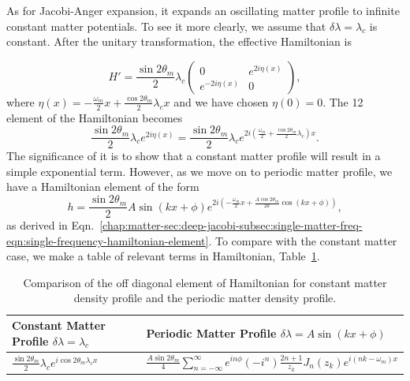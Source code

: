 As for Jacobi-Anger expansion, it expands an oscillating matter profile to infinite constant matter potentials. To see it more clearly, we assume that $\delta\lambda= \lambda_c$ is constant. After the unitary transformation, the effective Hamiltonian is

\begin{equation}
   H' = \frac{\sin 2\theta_m}{2} \lambda_c \begin{pmatrix} 0 & e^{2i\eta(x)} \\ e^{-2i\eta(x)} & 0 \end{pmatrix},
\end{equation}
where $\eta(x) = -\frac{\omega_m}{2}x + \frac{\cos 2\theta_m}{2}\lambda_c x$ and we have chosen $\eta(0)=0$.
The 12 element of the Hamiltonian becomes
\begin{equation}
   \frac{\sin 2\theta_m}{2} \lambda_c e^{2i\eta(x)} = \frac{\sin 2\theta_m}{2} \lambda_c e^{2i\left( \frac{\omega_m}{2} + \frac{\cos 2\theta_m}{2} \lambda_c \right)x} .
\end{equation}
The significance of it is to show that a constant matter profile will result in a simple exponential term. However, as we move on to periodic matter profile, we have a Hamiltonian element of the form
\begin{equation}
   h = \frac{\sin 2\theta_m}{2} A \sin (kx+\phi) e^{2i\left( -\frac{\omega_m}{2} x + \frac{A \cos 2\theta_m}{2k} \cos (kx+\phi) \right)},
\end{equation}
as derived in Eqn.~\ref{chap:matter-sec:deep-jacobi-subsec:single-matter-freq-eqn:single-frequency-hamiltonian-element}. To compare with the constant matter case, we make a table of relevant terms in Hamiltonian, Table~\ref{chap:matter-sec:deep-jacobi-subsec:single-matter-freq-tab:decomp-hamil-2}.

\begin{table}
\caption{\label{chap:matter-sec:deep-jacobi-subsec:single-matter-freq-tab:decomp-hamil-2} Comparison of the off diagonal element of Hamiltonian for constant matter density profile and the periodic matter density profile.}
\setlength\tabcolsep{2pt}
\begin{tabular}{l|l}
\hline
 Constant Matter Profile $\delta\lambda = \lambda_c$ &   Periodic Matter Profile $\delta\lambda=A\sin (kx+\phi)$ \\
\hline
   $\frac{\sin 2\theta_m}{2}\lambda_c e^{i \cos 2\theta_m \lambda_c x}$     &   $\frac{A\sin 2\theta_m}{4} \sum_{n=-\infty}^{\infty} e^{in\phi} \left( - i^n \right) \frac{2n+1}{z_k} J_n (z_k) e^{i(nk-\omega_m)x}$ \\
\hline
\end{tabular}
\end{table}

